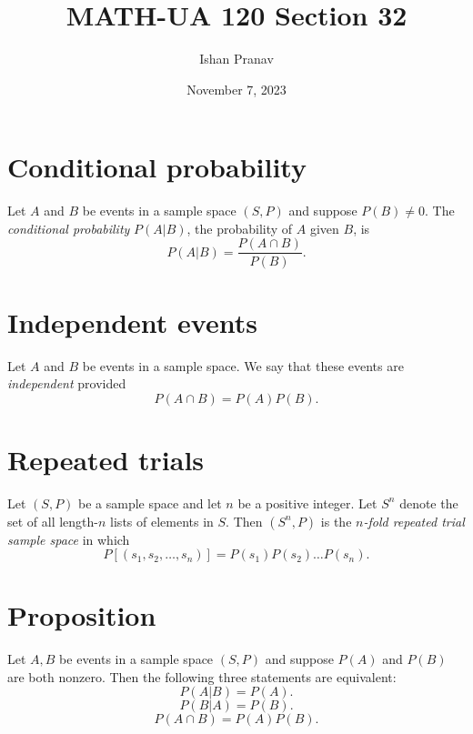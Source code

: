 \documentclass[12pt]{article}
\title{MATH-UA 120 Section 32}
\author{Ishan Pranav}
\date{November 7, 2023}
\begin{document}
\maketitle
\section*{Conditional probability}
Let $A$ and $B$ be events in a sample space $(S,P)$ and suppose $P(B)\neq 0$. The \textit{conditional probability} $P(A|B)$, the probability of $A$ given $B$, is
\[P(A|B)=\frac{P(A\cap B)}{P(B)}.\]
\section*{Independent events}
Let $A$ and $B$ be events in a sample space. We say that these events are \textit{independent} provided
\[P(A\cap B)=P(A)P(B).\]
\section*{Repeated trials}
Let $(S,P)$ be a sample space and let $n$ be a positive integer. Let $S^n$ denote the set of all length-$n$ lists of elements in $S$. Then $(S^n,P)$ is the \textit{$n$-fold repeated trial sample space} in which
\[P[(s_1,s_2,\dots,s_n)]=P(s_1)P(s_2)\dots P(s_n).\]
\section*{Proposition}
Let $A,B$ be events in a sample space $(S,P)$ and suppose $P(A)$ and $P(B)$ are both nonzero. Then the following three statements are equivalent:
\begin{equation}
P(A|B)=P(A).
\end{equation}
\begin{equation}
P(B|A)=P(B).
\end{equation}
\begin{equation}
P(A\cap B)=P(A)P(B).
\end{equation}
\end{document}
